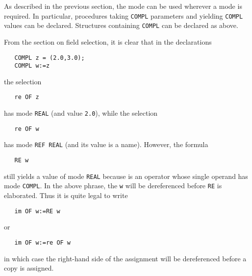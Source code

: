 As described in the previous section, the mode  can be
used wherever a mode is required.  In particular, procedures taking
\verb|COMPL| parameters and yielding \verb|COMPL| values can be
declared.  Structures containing \verb|COMPL| can be declared as
above.

From the section on field selection, it is clear that in the
declarations
\begin{verbatim}
   COMPL z = (2.0,3.0);
   COMPL w:=z
\end{verbatim}
\noindent
the selection
\begin{verbatim}
   re OF z
\end{verbatim}
\noindent
has mode \verb|REAL| (and value \verb|2.0|), while the selection
\begin{verbatim}
   re OF w
\end{verbatim}
\noindent
has mode \verb|REF REAL| (and its value is a name). However, the
formula
\begin{verbatim}
   RE w
\end{verbatim}
\noindent
still yields a value of mode \verb|REAL| because
 is an operator whose single operand has mode
\verb|COMPL|. In the above phrase, the \verb|w| will be dereferenced
before \verb|RE| is elaborated. Thus it is quite legal to write
\begin{verbatim}
   im OF w:=RE w
\end{verbatim}
\noindent
or
\begin{verbatim}
   im OF w:=re OF w
\end{verbatim}
\noindent
in which case the right-hand side of the assignment will be
dereferenced before a copy is assigned.

